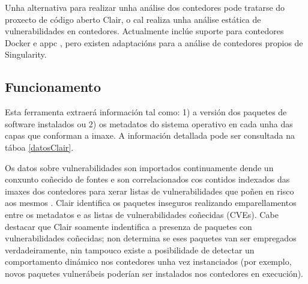 Unha alternativa para realizar unha análise dos contedores pode tratarse do proxecto de código aberto Clair, o cal realiza unha análise estática de vulnerabilidades en contedores. Actualmente inclúe suporte para contedores Docker e appc \cite{clair}, pero existen adaptacións para a análise de contedores propios de Singularity.

\subsection{Funcionamento}

Esta ferramenta extraerá información tal como: 1) a versión dos paquetes de software instalados ou 2) os metadatos do sistema operativo en cada unha das capas que conforman a imaxe. A información detallada pode ser consultada na táboa \ref{datosClair}.\\

\begin{table}[]
\centering
\caption{Datos recollidos por Clair}
\label{datosClair}
\end{table}

Os datos sobre vulnerabilidades son importados continuamente dende un conxunto coñecido de fontes e son correlacionados cos contidos indexados das imaxes dos contedores para xerar listas de vulnerabilidades que poñen en risco aos mesmos \cite{clairWeb}. Clair identifica os paquetes inseguros realizando emparellamentos entre os metadatos e as listas de vulnerabilidades coñecidas (\gls{CVE}s). Cabe destacar que Clair soamente indentifica a presenza de paquetes con vulnerabilidades coñecidas; non determina se eses paquetes van ser empregados verdadeiramente, nin tampouco existe a posibilidade de detectar un comportamento dinámico nos contedores unha vez instanciados (por exemplo, novos paquetes vulnerábeis poderían ser instalados nos contedores en execución). \cite{studySecurityDockerHub} \\

